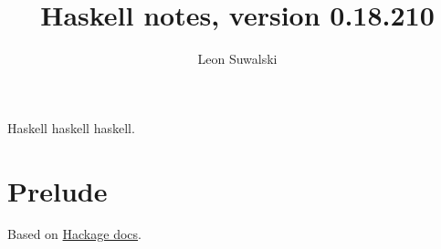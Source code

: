 \documentclass{charun}
\title{Haskell notes, version 0.18.210}
\author{Leon Suwalski}
\begin{document}
\begin{multicols*}{2}
\maketitle
\raggedright
Haskell haskell haskell.
\section{Prelude}
Based on \href{https://hackage.haskell.org/package/base-4.18.0.0/docs/Prelude.html}{Hackage docs}.









\end{multicols*}
\end{document}

